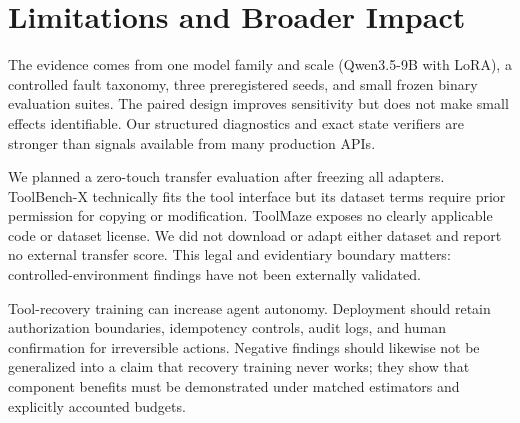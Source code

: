 \documentclass[10pt]{article}
\begin{document}
\section{Limitations and Broader Impact}
\label{sec:limitations}
The evidence comes from one model family and scale (Qwen3.5-9B with LoRA), a
controlled fault taxonomy, three preregistered seeds, and small frozen binary
evaluation suites.  The paired design improves sensitivity but does not make
small effects identifiable.  Our structured diagnostics and exact state
verifiers are stronger than signals available from many production APIs.

We planned a zero-touch transfer evaluation after freezing all adapters.
ToolBench-X technically fits the tool interface but its dataset terms require
prior permission for copying or modification.  ToolMaze exposes no clearly
applicable code or dataset license.  We did not download or adapt either
dataset and report no external transfer score.  This legal and evidentiary
boundary matters: controlled-environment findings have not been externally
validated.

Tool-recovery training can increase agent autonomy.  Deployment should retain
authorization boundaries, idempotency controls, audit logs, and human
confirmation for irreversible actions.  Negative findings should likewise
not be generalized into a claim that recovery training never works; they show
that component benefits must be demonstrated under matched estimators and
explicitly accounted budgets.


\end{document}
